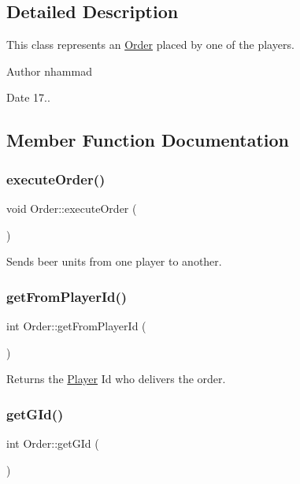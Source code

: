 \subsection{Detailed Description}
This class represents an \hyperlink{classOrder}{Order} placed by one of the players.

\begin{DoxyAuthor}{Author}
nhammad 
\end{DoxyAuthor}
\begin{DoxyDate}{Date}
17.. 
\end{DoxyDate}


\subsection{Member Function Documentation}
\mbox{\label{classOrder_a065c7828b1608d906dc9f2f2cc43ee35}} 
\subsubsection{\texorpdfstring{execute\+Order()}{executeOrder()}}
{\footnotesize\ttfamily void Order\+::execute\+Order (\begin{DoxyParamCaption}{ }\end{DoxyParamCaption})}

Sends beer units from one player to another. \mbox{\label{classOrder_a1d6ae1f551053272307fde77c2cffa58}} 
\subsubsection{\texorpdfstring{get\+From\+Player\+Id()}{getFromPlayerId()}}
{\footnotesize\ttfamily int Order\+::get\+From\+Player\+Id (\begin{DoxyParamCaption}{ }\end{DoxyParamCaption})}

Returns the \hyperlink{classPlayer}{Player} Id who delivers the order. \mbox{\label{classOrder_a89b55df1654ff4cb9db6608fc88c86ed}} 
\subsubsection{\texorpdfstring{get\+G\+Id()}{getGId()}}
{\footnotesize\ttfamily int Order\+::get\+G\+Id (\begin{DoxyParamCaption}{ }\end{DoxyParamCaption})}

